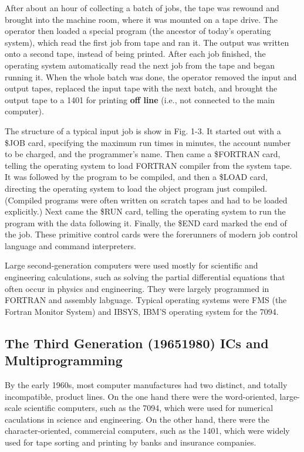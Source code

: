 \documentclass{book}
\newcommand {\kw}  [1] {\textbf{#1}}
\begin{document}
After about an hour of collecting a batch of jobs, the tape was rewound and brought into the machine room, where it was mounted on a tape drive.
The operator then loaded a special program (the ancestor of today's operating system), which read the first job from tape and ran it.
The output was written onto a second tape, instead of being printed.
After each job finished, the operating system automatically read the next job from the tape and began running it.
When the whole batch was done, the operator removed the input and output tapes, replaced the input tape with the next batch, 
and brought the output tape to a 1401 for printing \kw{off line} (i.e., not connected to the main computer).

The structure of a typical input job is show in Fig. 1-3.
It started out with a \$JOB card, specifying the maximum run times in minutes, the account number to be charged, and the programmer's name.
Then came a \$FORTRAN card, telling the operating system to load FORTRAN compiler from the system tape.
It was followed by the program to be compiled, and then a \$LOAD card, directing the operating system to load the object program just compiled.
(Compiled programs were often written on scratch tapes and had to be loaded explicitly.)
Next came the \$RUN card, telling the operating system to run the program with the data following it.
Finally, the \$END card marked the end of the job.
These primitive control cards were the forerunners of modern job control language and command interpreters.

Large second-generation computers were used mostly for scientific and engineering calculations, 
such as solving the partial differential equations that often occur in physics and engineering.
They were largely programmed in FORTRAN and assembly labguage.
Typical operating systems were FMS (the Fortran Monitor System) and IBSYS, IBM'S operating system for the 7094.

\subsection{The Third Generation (19651980) ICs and Multiprogramming}
By the early 1960s, most computer manufactures had two distinct, and totally incompatible, product lines.
On the one hand there were the word-oriented, large-scale scientific computers, such as the 7094, 
which were used for numerical caculations in science and engineering.
On the other hand, there were the character-oriented, commercial computers, such as the 1401, 
which were widely used for tape sorting and printing by banks and insurance companies.
\end{document}
